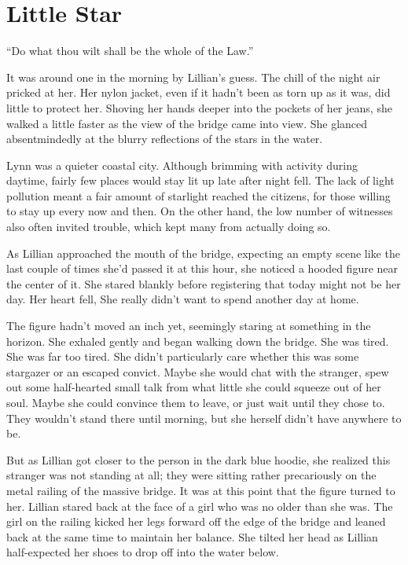 \chapter{Little Star}
\begin{ChapterNote}
``Do what thou wilt shall be the whole of the Law.''
\end{ChapterNote}
\begin{Standard}
It was around one in the morning by Lillian's guess. The chill of the night air
pricked at her. Her nylon jacket, even if it hadn't been as torn up as it was, did little
to protect her. Shoving her hands deeper into the pockets of her jeans, she walked a
little faster as the view of the bridge came into view. She glanced absentmindedly
at the blurry reflections of the stars in the water.

Lynn was a quieter coastal city. Although brimming with activity during daytime,
fairly few places would stay lit up late after night fell. The lack of light pollution
meant a fair amount of starlight reached the citizens, for those willing to stay up
every now and then. On the other hand, the low number of witnesses also often invited
trouble, which kept many from actually doing so.

As Lillian approached the mouth of the bridge, expecting an empty scene like the last
couple of times she'd passed it at this hour, she noticed a hooded figure near the center
of it. She stared blankly before registering that today might not be her day. Her heart fell,
She really didn't want to spend another day at home.

The figure hadn't moved an inch yet, seemingly staring at something in the horizon.
She exhaled gently and began walking down the bridge. She was tired. She was far too tired.
She didn't particularly care whether this was some stargazer or an escaped convict.
Maybe she would chat with the stranger, spew out some half-hearted small talk from
what little she could squeeze out of her soul. Maybe she could convince them to leave, or just
wait until they chose to. They wouldn't stand there until morning, but she herself didn't
have anywhere to be.

But as Lillian got closer to the person in the dark blue hoodie, she realized this stranger
was not standing at all; they were sitting rather precariously on the metal railing of the
massive bridge. It was at this point that the figure turned to her. Lillian stared back at the
face of a girl who was no older than she was. The girl on the railing kicked her legs forward
off the edge of the bridge and leaned back at the same time to maintain her balance. She tilted
her head as Lillian half-expected her shoes to drop off into the water below.


\end{Standard}
